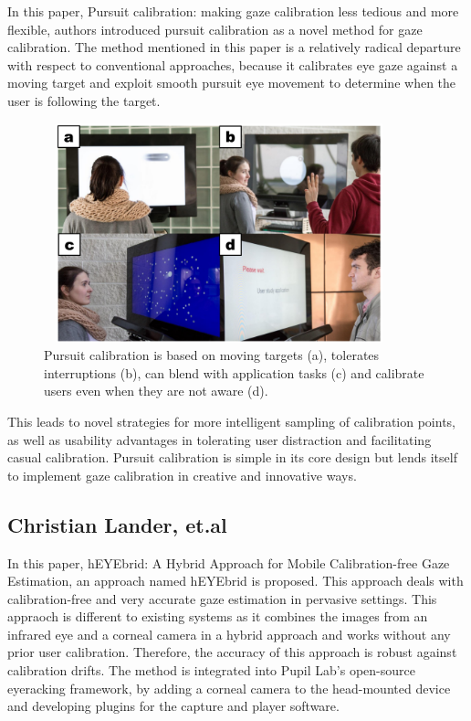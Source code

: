 In this paper, Pursuit calibration: making gaze calibration less tedious and more flexible, authors introduced pursuit calibration as a novel method for gaze calibration. The method mentioned in this paper is a relatively radical departure with respect to conventional approaches, because it calibrates eye gaze against a moving target and exploit smooth pursuit eye movement to determine when the user is following the target. 
\begin{figure}[!hbt]
  \centering
  \includegraphics[width=4in,height=2.5in]{kenpfeffer.png}
  \caption{Pursuit calibration is based on moving targets (a), tolerates interruptions (b), can blend with application tasks (c) and calibrate users even when they are not aware (d).}
  \label{kenpfeffer}
\end{figure}

This leads to novel strategies for more intelligent sampling of calibration points, as well as usability advantages in tolerating user distraction and facilitating casual calibration. Pursuit calibration is simple in its core design but lends itself to implement gaze calibration in creative and innovative ways.

\subsection{Christian Lander, et.al \cite{13}}

In this paper, hEYEbrid: A Hybrid Approach for Mobile Calibration-free Gaze Estimation, an approach named hEYEbrid is proposed. This approach deals with calibration-free and very accurate gaze estimation in pervasive settings. This appraoch is different to existing systems as it combines the images from an infrared eye and a corneal camera in a hybrid approach and works without any prior user calibration. Therefore, the accuracy of this approach is robust against calibration drifts. The method is integrated into Pupil Lab’s \cite{29} open-source eyeracking framework, by adding a corneal camera to the head-mounted device and developing plugins for the capture and player software.


